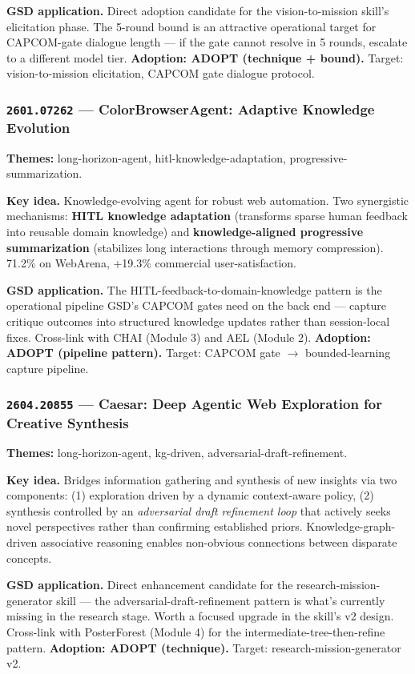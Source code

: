 \documentclass[11pt,letterpaper]{article}
\newcommand{\arxivid}[1]{\texttt{\textcolor{accent}{#1}}}
\newcommand{\paperhead}[2]{\noindent\textbf{\sffamily\textcolor{secondary}{#1}} \textemdash{} #2}
\begin{document}
\textbf{GSD application.} Direct adoption candidate for the vision-to-mission skill's elicitation phase. The 5-round bound is an attractive operational target for CAPCOM-gate dialogue length --- if the gate cannot resolve in 5 rounds, escalate to a different model tier. \textbf{Adoption: ADOPT (technique + bound).} Target: vision-to-mission elicitation, CAPCOM gate dialogue protocol.

\subsubsection{\arxivid{2601.07262} --- ColorBrowserAgent: Adaptive Knowledge Evolution}

\paperhead{Themes:}{long-horizon-agent, hitl-knowledge-adaptation, progressive-summarization.}

\textbf{Key idea.} Knowledge-evolving agent for robust web automation. Two synergistic mechanisms: \textbf{HITL knowledge adaptation} (transforms sparse human feedback into reusable domain knowledge) and \textbf{knowledge-aligned progressive summarization} (stabilizes long interactions through memory compression). 71.2\% on WebArena, +19.3\% commercial user-satisfaction.

\textbf{GSD application.} The HITL-feedback-to-domain-knowledge pattern is the operational pipeline GSD's CAPCOM gates need on the back end --- capture critique outcomes into structured knowledge updates rather than session-local fixes. Cross-link with CHAI (Module 3) and AEL (Module 2). \textbf{Adoption: ADOPT (pipeline pattern).} Target: CAPCOM gate $\to$ bounded-learning capture pipeline.

\subsubsection{\arxivid{2604.20855} --- Caesar: Deep Agentic Web Exploration for Creative Synthesis}

\paperhead{Themes:}{long-horizon-agent, kg-driven, adversarial-draft-refinement.}

\textbf{Key idea.} Bridges information gathering and synthesis of new insights via two components: (1) exploration driven by a dynamic context-aware policy, (2) synthesis controlled by an \textit{adversarial draft refinement loop} that actively seeks novel perspectives rather than confirming established priors. Knowledge-graph-driven associative reasoning enables non-obvious connections between disparate concepts.

\textbf{GSD application.} Direct enhancement candidate for the research-mission-generator skill --- the adversarial-draft-refinement pattern is what's currently missing in the research stage. Worth a focused upgrade in the skill's v2 design. Cross-link with PosterForest (Module 4) for the intermediate-tree-then-refine pattern. \textbf{Adoption: ADOPT (technique).} Target: research-mission-generator v2.
\end{document}
